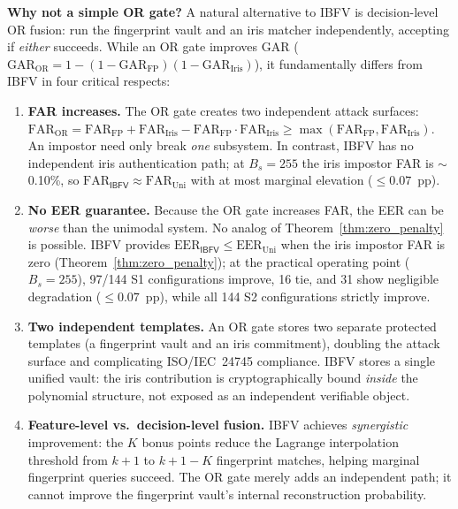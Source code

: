 \documentclass[conference]{IEEEtran}
\newcommand{\IBFV}{\textsf{IBFV}}
\newcommand{\EER}{\mathrm{EER}}
\newcommand{\GAR}{\mathrm{GAR}}
\newcommand{\FAR}{\mathrm{FAR}}
\begin{document}
\textbf{Why not a simple OR gate?} A natural alternative to \IBFV{} is decision-level OR fusion: run the fingerprint vault and an iris matcher independently, accepting if \emph{either} succeeds. While an OR gate improves GAR ($\GAR_{\text{OR}} = 1 - (1 - \GAR_{\text{FP}})(1 - \GAR_{\text{Iris}})$), it fundamentally differs from \IBFV{} in four critical respects:
\begin{enumerate}
    \item \textbf{FAR increases.} The OR gate creates two independent attack surfaces: $\FAR_{\text{OR}} = \FAR_{\text{FP}} + \FAR_{\text{Iris}} - \FAR_{\text{FP}} \cdot \FAR_{\text{Iris}} \geq \max(\FAR_{\text{FP}}, \FAR_{\text{Iris}})$. An impostor need only break \emph{one} subsystem. In contrast, \IBFV{} has no independent iris authentication path; at $B_s = 255$ the iris impostor FAR is $\sim$0.10\%, so $\FAR_{\IBFV} \approx \FAR_{\text{Uni}}$ with at most marginal elevation ($\leq 0.07$~pp).
    \item \textbf{No EER guarantee.} Because the OR gate increases FAR, the EER can be \emph{worse} than the unimodal system. No analog of Theorem~\ref{thm:zero_penalty} is possible. \IBFV{} provides $\EER_{\IBFV} \leq \EER_{\text{Uni}}$ when the iris impostor FAR is zero (Theorem~\ref{thm:zero_penalty}); at the practical operating point ($B_s = 255$), 97/144 S1 configurations improve, 16 tie, and 31 show negligible degradation ($\leq 0.07$~pp), while all 144 S2 configurations strictly improve.
    \item \textbf{Two independent templates.} An OR gate stores two separate protected templates (a fingerprint vault and an iris commitment), doubling the attack surface and complicating ISO/IEC~24745 compliance. \IBFV{} stores a single unified vault: the iris contribution is cryptographically bound \emph{inside} the polynomial structure, not exposed as an independent verifiable object.
    \item \textbf{Feature-level vs.\ decision-level fusion.} \IBFV{} achieves \emph{synergistic} improvement: the $K$ bonus points reduce the Lagrange interpolation threshold from $k{+}1$ to $k{+}1{-}K$ fingerprint matches, helping marginal fingerprint queries succeed. The OR gate merely adds an independent path; it cannot improve the fingerprint vault's internal reconstruction probability.
\end{enumerate}
\end{document}
